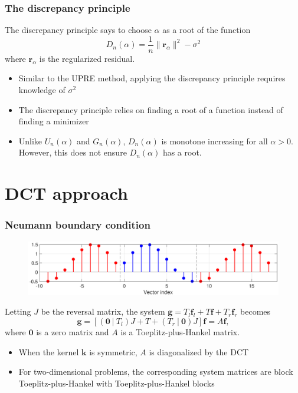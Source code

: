 \documentclass[t]{beamer}
\newcommand{\noiseSD}{\sigma}	%
\newcommand{\gVec}{\mathbf{g}}	%
\newcommand{\kVec}{\mathbf{k}}	%
\newcommand{\fVec}{\mathbf{f}}	%
\newcommand{\regparam}{\alpha}
\newcommand{\regres}{\mathbf{r}_{\regparam}}	%
\newcommand{\U}{U}	%
\newcommand{\GCV}{G}	%
\newcommand{\D}{D}	%
\begin{document}
\begin{frame}
\frametitle{The discrepancy principle}
The discrepancy principle \cite{Morozov1966} says to choose $\regparam$ as a root of the function
\[\D_n(\regparam) = \frac{1}{n}\|\regres\|^2 - \noiseSD^2\]
where $\regres$ is the regularized residual.
\begin{itemize}
\item Similar to the UPRE method, applying the discrepancy principle requires knowledge of $\noiseSD^2$
\item The discrepancy principle relies on finding a root of a function instead of finding a minimizer
\item Unlike $\U_n(\regparam)$ and $\GCV_n(\regparam)$, $\D_n(\regparam)$ is monotone increasing for all $\regparam > 0$. However, this does not ensure $\D_n(\regparam)$ has a root.
\end{itemize}
\end{frame}

\section{DCT approach}

\begin{frame}[b]
\frametitle{Neumann boundary condition}
\begin{figure}
\centering
\includegraphics[scale=0.25]{Figures/NeumannBC.eps}
\end{figure}
Letting $J$ be the reversal matrix, the system $\gVec = T_{l}\fVec_{l} + T\fVec + T_{r}\fVec_{r}$ becomes
\[\gVec = [(\mathbf{0}~|~T_{l})J + T + (T_{r}~|~\mathbf{0})J]\fVec = A\fVec,\]
where $\mathbf{0}$ is a zero matrix and $A$ is a Toeplitz-plus-Hankel matrix.
\begin{itemize}
\item When the kernel $\kVec$ is symmetric, $A$ is diagonalized by the DCT \cite{Martucci1994,NeumannDCT}
\item For two-dimensional problems, the corresponding system matrices are block Toeplitz-plus-Hankel with Toeplitz-plus-Hankel blocks \cite{NeumannDCT}
\end{itemize}
\end{frame}
\end{document}
